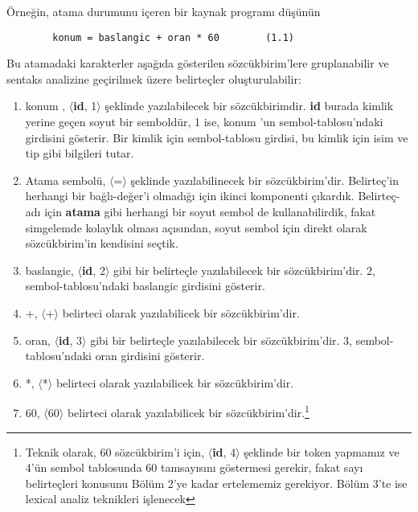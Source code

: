\documentclass{book}
\begin{document}
Örneğin, atama durumunu içeren bir kaynak programı düşünün

\begin{lstlisting}
 		konum = baslangic + oran * 60        (1.1)
\end{lstlisting}

Bu atamadaki karakterler aşağıda gösterilen sözcükbirim'lere gruplanabilir ve sentaks analizine geçirilmek üzere belirteçler oluşturulabilir:

\begin{enumerate}

  \item {\selectfont konum }, $\langle$\textbf{id}, 1$\rangle$ şeklinde yazılabilecek bir sözcükbirimdir. \textbf{id} burada kimlik yerine geçen soyut bir semboldür, 1 ise, {\selectfont konum }'un sembol-tablosu'ndaki girdisini gösterir. Bir kimlik için sembol-tablosu girdisi, bu kimlik için isim ve tip gibi bilgileri tutar.
  
  \item Atama sembolü, $\langle$=$\rangle$ şeklinde yazılabilinecek bir sözcükbirim'dir. Belirteç'in herhangi bir bağlı-değer'i olmadığı için ikinci komponenti çıkardık. Belirteç-adı için \textbf{atama} gibi herhangi bir soyut sembol de kullanabilirdik, fakat simgelemde kolaylık olması açısından, soyut sembol için direkt olarak sözcükbirim'in kendisini seçtik.
  
   \item {\selectfont baslangic}, $\langle$\textbf{id}, 2$\rangle$ gibi bir belirteçle yazılabilecek bir sözcükbirim'dir. 2, sembol-tablosu'ndaki {\selectfont baslangic} girdisini gösterir.
   
   \item +, $\langle$+$\rangle$ belirteci olarak yazılabilicek bir sözcükbirim'dir.
   
   \item {\selectfont oran}, $\langle$\textbf{id}, 3$\rangle$ gibi bir belirteçle yazılabilecek bir sözcükbirim'dir. 3, sembol-tablosu'ndaki {\selectfont oran} girdisini gösterir.
   
   \item *, $\langle$*$\rangle$ belirteci olarak yazılabilicek bir sözcükbirim'dir.
   
   \renewcommand{\thefootnote}{\arabic{footnote}}
   \setcounter{footnote}{0}
   
   \item 60, $\langle$60$\rangle$ belirteci olarak yazılabilicek bir sözcükbirim'dir.\footnote{Teknik olarak, 60 sözcükbirim'i için, $\langle$\textbf{id}, 4$\rangle$ şeklinde bir token yapmamız ve 4'ün sembol tablosunda 60 tamsayısını göstermesi gerekir, fakat sayı belirteçleri konusunu Bölüm 2'ye kadar ertelememiz gerekiyor. Bölüm 3'te ise lexical analiz teknikleri işlenecek} 
   
   \renewcommand{\thefootnote}{\fnsymbol{footnote}}
    
\end{enumerate} 
\end{document}
